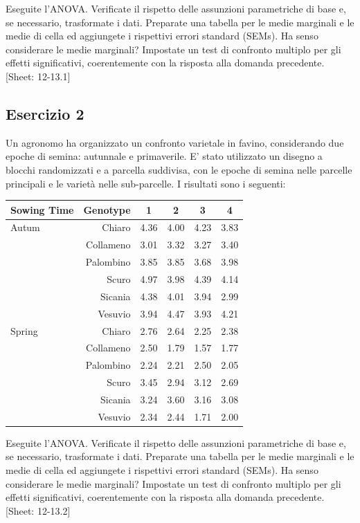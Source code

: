 \documentclass[a4paper,12pt,oneside]{book}
\begin{document}
Eseguite l'ANOVA. Verificate il rispetto delle assunzioni parametriche di base e, se necessario, trasformate i dati. Preparate una tabella per le medie marginali e le medie di cella ed aggiungete i rispettivi errori standard (SEMs). Ha senso considerare le medie marginali? Impostate un test di confronto multiplo per gli effetti significativi, coerentemente con la risposta alla domanda precedente.
{[}Sheet: 12-13.1{]}

\hypertarget{esercizio-2-8}{%
\subsection{Esercizio 2}\label{esercizio-2-8}}

Un agronomo ha organizzato un confronto varietale in favino, considerando due epoche di semina: autunnale e primaverile. E' stato utilizzato un disegno a blocchi randomizzati e a parcella suddivisa, con le epoche di semina nelle parcelle principali e le varietà nelle sub-parcelle. I risultati sono i seguenti:

\begin{longtable}[]{@{}lrcccc@{}}
\toprule()
Sowing Time & Genotype & 1 & 2 & 3 & 4 \\
\midrule()
\endhead
Autum & Chiaro & 4.36 & 4.00 & 4.23 & 3.83 \\
& Collameno & 3.01 & 3.32 & 3.27 & 3.40 \\
& Palombino & 3.85 & 3.85 & 3.68 & 3.98 \\
& Scuro & 4.97 & 3.98 & 4.39 & 4.14 \\
& Sicania & 4.38 & 4.01 & 3.94 & 2.99 \\
& Vesuvio & 3.94 & 4.47 & 3.93 & 4.21 \\
Spring & Chiaro & 2.76 & 2.64 & 2.25 & 2.38 \\
& Collameno & 2.50 & 1.79 & 1.57 & 1.77 \\
& Palombino & 2.24 & 2.21 & 2.50 & 2.05 \\
& Scuro & 3.45 & 2.94 & 3.12 & 2.69 \\
& Sicania & 3.24 & 3.60 & 3.16 & 3.08 \\
& Vesuvio & 2.34 & 2.44 & 1.71 & 2.00 \\
\bottomrule()
\end{longtable}

Eseguite l'ANOVA. Verificate il rispetto delle assunzioni parametriche di base e, se necessario, trasformate i dati. Preparate una tabella per le medie marginali e le medie di cella ed aggiungete i rispettivi errori standard (SEMs). Ha senso considerare le medie marginali? Impostate un test di confronto multiplo per gli effetti significativi, coerentemente con la risposta alla domanda precedente.
{[}Sheet: 12-13.2{]}
\end{document}
